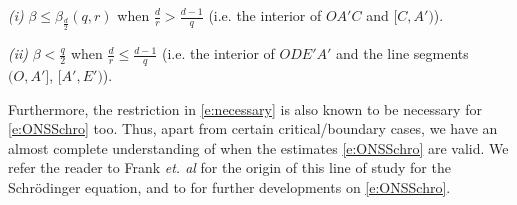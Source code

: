 \documentclass[a4paper]{amsart}
\numberwithin{equation}{section}%
\theoremstyle{plain}%
\theoremstyle{definition}
\theoremstyle{remark}%
\begin{document}
\emph{(i)} $\beta \leq \beta_{\frac{d}{2}}(q,r)$ when $\frac{d}{r} > \frac{d-1}{q}$ (i.e. the interior of $OA'C$ and $[C,A')$).

\emph{(ii)} $\beta < \frac{q}{2}$ when $\frac{d}{r} \leq \frac{d-1}{q}$ (i.e. the interior of $ODE'A'$ and the line segments $(O,A']$, $[A',E')$).

Furthermore, the restriction in \eqref{e:necessary} is also known to be necessary for \eqref{e:ONSSchro} too. Thus, apart from certain critical/boundary cases, we have an almost complete understanding of when the estimates \eqref{e:ONSSchro} are valid. We refer the reader to Frank \emph{et. al} \cite{FLLS} for the origin of this line of study for the Schr\"odinger equation, and to \cite{FS_AJM, FS_Survey, BHLNS} for further developments on \eqref{e:ONSSchro}.   


\end{document}
